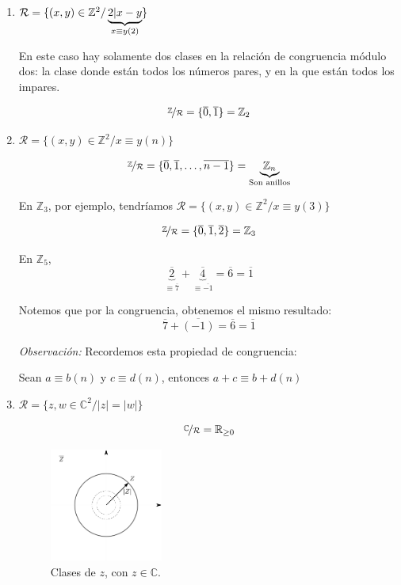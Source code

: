\begin{enumerate}
    \item $\mathcal{R} = \{ (x,y) \in \mathbb{Z}^2 / 
        \underbrace{\divides{2}{x-y}}_{x \equiv y (2)} \}$ 

        En este caso hay solamente dos clases en la relación de congruencia
        módulo dos: la clase donde están todos los números pares, y en la que
        están todos los impares.

        \[ \nicefrac{\mathbb{Z}}{\mathcal{R}} 
            = \{ \overline{0}, \overline{1} \} 
        = \mathbb{Z}_2 \]

    \item $\mathcal{R} = \{ (x,y) \in \mathbb{Z}^2 / x \equiv y (n) \}$

        \[ \nicefrac{\mathbb{Z}}{\mathcal{R}} 
        = \{\overline{0}, \overline{1}, \dotsc, \overline{n-1} \} 
        = \underbrace{\mathbb{Z}_n}_{\text{Son anillos}} \]

        En $\mathbb{Z}_3$, por ejemplo, tendríamos 
        $\mathcal{R}=\{ (x,y)\in \mathbb{Z}^2 / x \equiv y(3) \}$

        \begin{gather*}
            \nicefrac{\mathbb{Z}}{\mathcal{R}} = \{ \overline{0},
            \overline{1},\overline{2} \} = \mathbb{Z}_3
        \end{gather*}
        
        En $\mathbb{Z}_5$, 
        \[\underbrace{\overline{2}}_{\equiv \overline{7}} 
        + \underbrace{\overline{4}}_{\equiv \overline{-1}} 
        = \overline{6} = \overline{1} \]

        Notemos que por la congruencia, obtenemos el mismo resultado:
        \[ \overline{7} + \overline{(-1)} = \overline{6} = \overline{1} \]

        \bigskip
        \textit{Observación:} 
        Recordemos esta propiedad de congruencia:

        Sean $a \equiv b(n)$ y $c \equiv d (n)$, entonces $a+c \equiv b+d(n)$

    \item $\mathcal{R} = \{z,w \in \mathbb{C}^2 / |z| = |w| \}$

        \[ \nicefrac{\mathbb{C}}{\mathcal{R}} = \mathbb{R}_{\geq 0}\]

        \begin{figure}[H]
            \centering
            \includegraphics[width=0.35\textwidth]{clase_de_z_complejo.png}
            \caption{Clases de $z$, con $z \in \mathbb{C}$.}
        \end{figure}


\end{enumerate}
